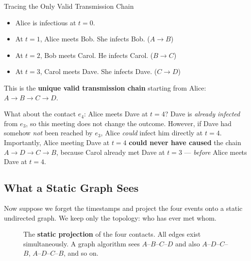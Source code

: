 \begin{examplebox}{Tracing the Only Valid Transmission Chain}
\begin{itemize}[noitemsep]
    \item Alice is infectious at $t=0$.
    \item At $t=1$, Alice meets Bob. She infects Bob. ($A \to B$)
    \item At $t=2$, Bob meets Carol. He infects Carol. ($B \to C$)
    \item At $t=3$, Carol meets Dave. She infects Dave. ($C \to D$)
\end{itemize}
This is the \textbf{unique valid transmission chain} starting from Alice:
$A \to B \to C \to D$.

What about the contact $e_4$: Alice meets Dave at $t=4$? Dave is
\emph{already infected} from $e_3$, so this meeting does not change the
outcome. However, if Dave had somehow \emph{not} been reached by $e_3$, Alice
\emph{could} infect him directly at $t=4$. Importantly, Alice meeting Dave at
$t=4$ \textbf{could never have caused} the chain $A \to D \to C \to B$,
because Carol already met Dave at $t=3$ --- \emph{before} Alice meets Dave at
$t=4$.
\end{examplebox}

\subsection{What a Static Graph Sees}

Now suppose we forget the timestamps and project the four events onto a static
undirected graph. We keep only the topology: who has ever met whom.

\begin{figure}[H]
\centering
{}
\caption{The \textbf{static projection} of the four contacts. All edges exist
simultaneously. A graph algorithm sees $A$--$B$--$C$--$D$ and also
$A$--$D$--$C$--$B$, $A$--$D$--$C$--$B$, and so on.}
\label{fig:static_projection}
\end{figure}

